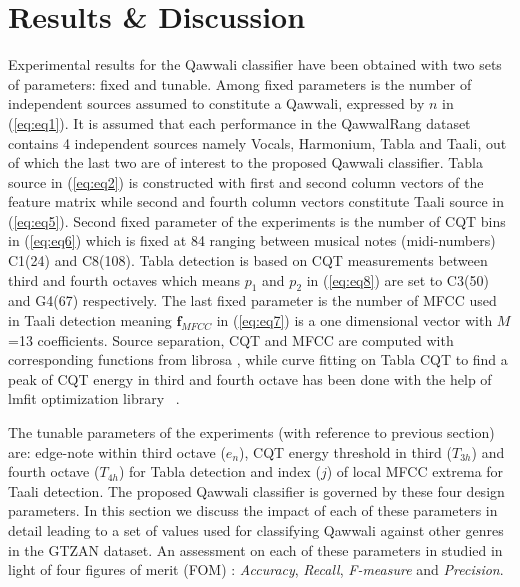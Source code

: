 \documentclass{article}
\begin{document}
\section{Results \& Discussion}\label{sec:result}
Experimental results for the Qawwali classifier have been obtained with two sets of parameters: fixed and tunable. Among fixed parameters is the number of independent sources assumed to constitute a Qawwali, expressed by ${n}$ in (\ref{eq:eq1}). It is assumed that each performance in the QawwalRang dataset contains 4 independent sources namely Vocals, Harmonium, Tabla and Taali, out of which the last two are of interest to the proposed Qawwali classifier. Tabla source in (\ref{eq:eq2}) is constructed with first and second column vectors of the feature matrix while second and fourth column vectors constitute Taali source in (\ref{eq:eq5}). Second fixed parameter of the experiments is the number of CQT bins in (\ref{eq:eq6}) which is fixed at 84 ranging between musical notes (midi-numbers) C1(24) and C8(108). Tabla detection is based on CQT measurements between third and fourth octaves which means $p_{1}$ and $p_{2}$ in (\ref{eq:eq8}) are set to C3(50) and G4(67) respectively. The last fixed parameter is the number of MFCC used in Taali detection meaning $\boldsymbol{f}_{MFCC}$ in (\ref{eq:eq7}) is a one dimensional vector with $M$=13 coefficients. Source separation, CQT and MFCC are computed with corresponding functions from librosa \citep{brian_mcfee_2022_6097378}, while curve fitting on Tabla CQT to find a peak of CQT energy in third and fourth octave has been done with the help of lmfit optimization library ~\citep{newville_matthew_2014}.

The tunable parameters of the experiments (with reference to previous section) are: edge-note within third octave ($e_{n}$), CQT energy threshold in third ($T_{3h}$) and fourth octave ($T_{4h}$) for Tabla detection and index ($j$) of local MFCC extrema for Taali detection. The proposed Qawwali classifier is governed by these four design parameters. In this section we discuss the impact of each of these parameters in detail leading to a set of values used for classifying Qawwali against other genres in the GTZAN dataset. An assessment on each of these parameters in studied in light of four figures of merit (FOM) \citep{music_genre_survey}: \textit{Accuracy}, \textit{Recall}, \textit{F-measure} and \textit{Precision}.
\end{document}
